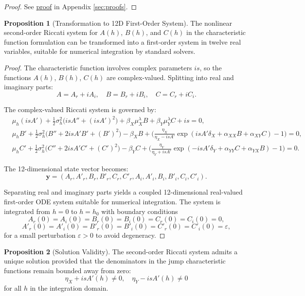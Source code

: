 \documentclass{article}
\theoremstyle{definition}
\newtheorem{proposition}{Proposition}[section]
\newcommand{\proofref}[1]{\hyperlink{#1}{proof}}
\begin{document}
\begin{proof}
See \proofref{prop:cf_riccati} in Appendix \ref{sec:proofs}.
\end{proof}

\begin{proposition}[Transformation to 12D First-Order System]
\label{prop:12d_transform}
The nonlinear second-order Riccati system for $A(h)$, $B(h)$, and $C(h)$ in the characteristic function formulation can be transformed into a first-order system in twelve real variables, suitable for numerical integration by standard solvers.
\end{proposition}

\begin{proof}
The characteristic function involves complex parameters $is$, so the functions $A(h)$, $B(h)$, $C(h)$ are complex-valued. Splitting into real and imaginary parts:
\[
A = A_r + i A_i, \quad 
B = B_r + i B_i, \quad 
C = C_r + i C_i.
\]

The complex-valued Riccati system is governed by:
\[
\begin{aligned}
& \mu_h (is A') 
+ \tfrac{1}{2}\sigma_h^2 \big( is A'' + (is A')^2 \big)
+ \beta_X \mu_X^\lambda B 
+ \beta_Y \mu_Y^\lambda C 
+ is = 0, \\[0.8ex]
& \mu_h B' 
+ \tfrac{1}{2}\sigma_h^2 \big( B'' + 2 is A' B' + (B')^2 \big)
- \beta_X B 
+ \Big( \tfrac{\eta_X}{\eta_X - is A'} 
\exp\!\left( is A' \delta_X + \alpha_{XX} B + \alpha_{XY} C \right) - 1 \Big) 
= 0, \\[0.8ex]
& \mu_h C' 
+ \tfrac{1}{2}\sigma_h^2 \big( C'' + 2 is A' C' + (C')^2 \big)
- \beta_Y C 
+ \Big( \tfrac{\eta_Y}{\eta_Y + is A'} 
\exp\!\left( -is A' \delta_Y + \alpha_{YY} C + \alpha_{YX} B \right) - 1 \Big) 
= 0.
\end{aligned}
\]

The 12-dimensional state vector becomes:
\[
\mathbf{y} = (A_r, A'_r, B_r, B'_r, C_r, C'_r, A_i, A'_i, B_i, B'_i, C_i, C'_i).
\]

Separating real and imaginary parts yields a coupled 12-dimensional real-valued first-order ODE system suitable for numerical integration. The system is integrated from $h = 0$ to $h = h_0$ with boundary conditions
\[
A_r(0) = A_i(0) = B_r(0) = B_i(0) = C_r(0) = C_i(0) = 0,
\]
\[
A'_r(0) = A'_i(0) = B'_r(0) = B'_i(0) = C'_r(0) = C'_i(0) = \varepsilon,
\]
for a small perturbation $\varepsilon > 0$ to avoid degeneracy.
\end{proof}

\begin{proposition}[Solution Validity]
\label{prop:cf_validity}
The second-order Riccati system admits a unique solution provided that the denominators in the jump characteristic functions remain bounded away from zero:
\begin{equation}
\eta_X + is A'(h) \neq 0, \quad \eta_Y - is A'(h) \neq 0 \label{eq:cf_validity_condition}
\end{equation}
for all $h$ in the integration domain.
\end{proposition}
\end{document}
